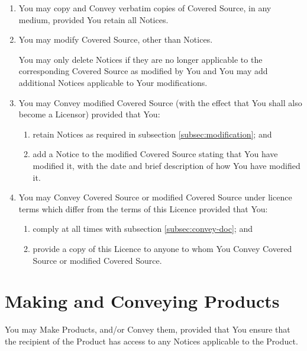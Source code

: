 \documentclass[10pt, a4paper]{article}
\begin{document}
\begin{enumerate}[label=\ref*{sec:copying}.\arabic*]
\item
You may copy and Convey verbatim copies of Covered Source, in any medium, provided You retain all Notices.

  \item \label{subsec:modification} You may modify Covered Source, other than Notices.
  
You may only delete Notices if they are no longer applicable to the corresponding Covered Source as modified by You and You may add additional Notices applicable to Your modifications.
  
\item
\label{subsec:convey-doc}
You may Convey modified Covered Source (with the effect that You shall also become a Licensor) provided that You:
\begin{enumerate}[label=\alph*)]
\item retain Notices as required in subsection \ref*{subsec:modification}; and

\item \label{subsubsec:modify-notice} add a Notice to the modified Covered Source stating that You have modified it, with the date and brief description of how You have modified it.

\end{enumerate}

\item
\label{subsec:sublicence-doc}
You may Convey Covered Source or modified Covered Source under licence terms
which differ from the terms of this Licence provided that You:
\begin{enumerate}[label=\alph*)]
\item comply at all times with subsection \ref*{subsec:convey-doc}; and
\item provide a copy of this Licence to anyone to whom You Convey Covered Source or modified Covered Source.
\end{enumerate}
\end{enumerate}
\section{Making and Conveying Products}
\label{subsec:convey-products}
You may Make Products, and/or Convey them, provided that You ensure that the recipient of the Product has access to any Notices applicable to the Product. 
\end{document}
